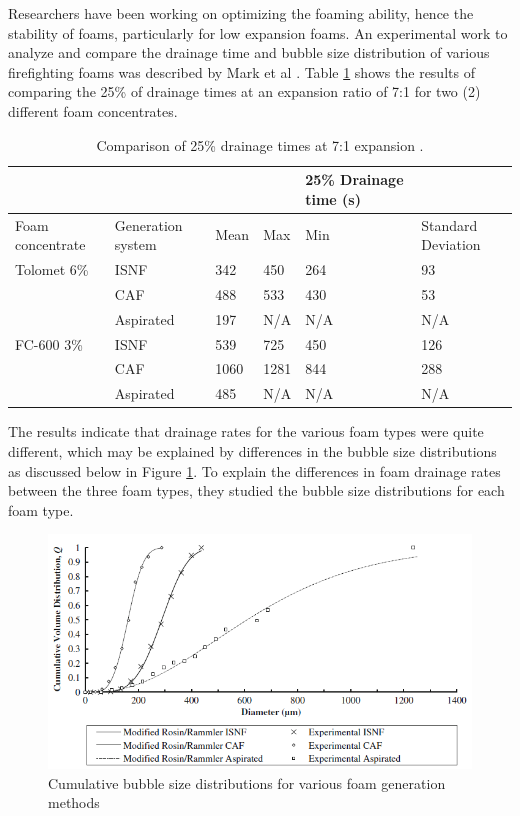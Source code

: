 \documentclass[12pt]{report}
\begin{document}
Researchers have been working on optimizing the foaming ability, hence the stability of foams, particularly for low expansion foams.  An experimental work to analyze and compare the drainage time and bubble size distribution of various firefighting foams was described by Mark et al \cite{laundess2012suppression}. Table \ref{ch2:table:times} shows the results of \cite{laundess2012suppression} comparing the 25\% of drainage times at an expansion ratio of 7:1 for two (2) different foam concentrates. \\

\begin{table}[H]
\caption{Comparison of 25\% drainage times at 7:1 expansion \cite{laundess2012suppression}.}   

\centering
\begin{tabular}{m{5em} m{5em} m{4em} m{4em} m{4em} m{5em}}
    \hline
    & & & & 25\% Drainage time (s) \\
    \hline
    Foam concentrate & Generation system & Mean & Max & Min & Standard Deviation \\ 
    Tolomet 6\% & ISNF & 342 & 450 & 264 & 93 \\
    & CAF & 488 & 533 & 430 & 53 \\
    & Aspirated & 197 & N/A & N/A & N/A \\
    FC-600 3\% & ISNF & 539 & 725 & 450 & 126 \\
    & CAF & 1060 & 1281 & 844 & 288 \\
    & Aspirated & 485 & N/A & N/A & N/A \\
    \hline
\end{tabular}

\label{ch2:table:times}
\end{table}

The results indicate that drainage rates for the various foam types were quite different, which may be explained by differences in the bubble size distributions as discussed below in Figure \ref{ch2:figure:distributions}. To explain the differences in foam drainage rates between the three foam types, they studied the bubble size distributions for each foam type.

\begin{figure}[H]
    \centering
    \includegraphics[width=\textwidth]{bubble_size_distributions.png}
    \caption{Cumulative bubble size distributions for various foam generation methods}
    \label{ch2:figure:distributions}
\end{figure}
\end{document}
